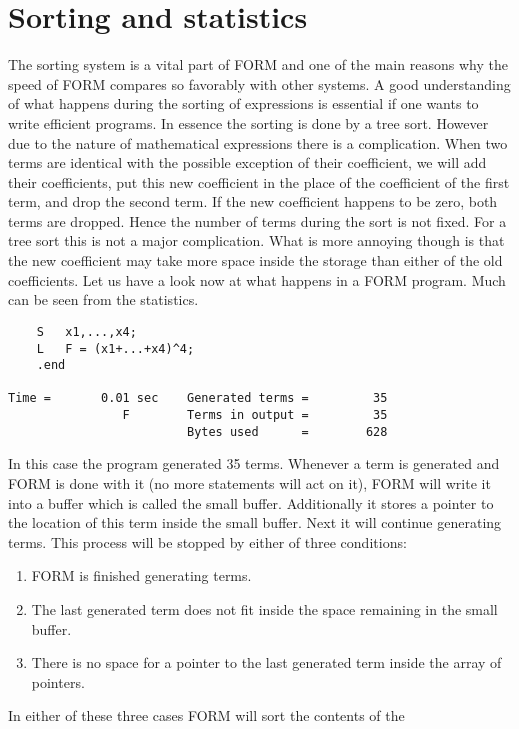
\section{Sorting and statistics}
\label{sorting}

The sorting system is a vital part of FORM and one of the main reasons why 
the speed of FORM compares so favorably with other systems. 
A good understanding of what happens during the sorting of 
expressions is essential if one wants to write efficient 
programs. In essence the sorting is done by a tree sort. 
However due to the nature of mathematical expressions there is a 
complication. When two terms are identical with the possible exception of 
their coefficient, we will add their coefficients, put this new coefficient 
in the place of the coefficient of the first term, and drop the second 
term. If the new coefficient happens to be zero, both terms are dropped. 
Hence the number of terms during the sort is not fixed. For a tree sort 
this is not a major complication. What is more annoying 
though is that the new coefficient may take more space inside the storage 
than either of the old coefficients. Let us have a look now at what happens 
in a FORM program. Much can be seen from the statistics.
\begin{verbatim}
    S	x1,...,x4;
    L	F = (x1+...+x4)^4;
    .end

Time =       0.01 sec    Generated terms =         35
                F        Terms in output =         35
                         Bytes used      =        628
\end{verbatim}
In this case the program generated 35 terms. Whenever a term is generated 
and FORM is done with it (no more statements will act on it), FORM 
will write it into a buffer which is called the small buffer. Additionally 
it stores a pointer to the location of this term inside the small buffer. 
Next it will continue generating terms. This process will be stopped by 
either of three conditions:
\begin{enumerate}
\item FORM is finished generating terms.
\item The last generated term does not fit inside the space remaining in 
the small buffer.
\item There is no space for a pointer to the last generated term inside the 
array of pointers.
\end{enumerate}
In either of these three cases FORM will sort the contents of the 
